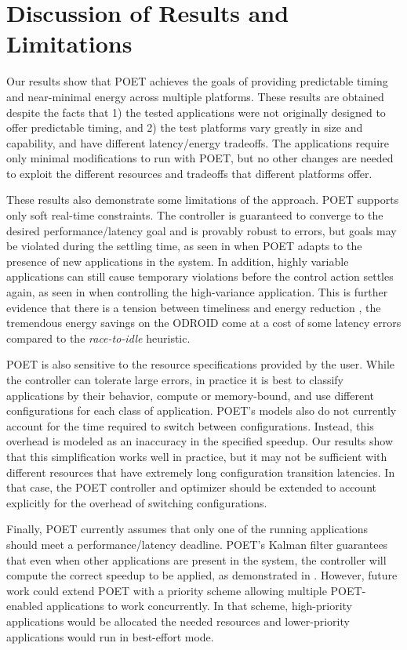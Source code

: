\section{Discussion of Results and Limitations}

Our results show that POET achieves the goals of providing predictable timing and near-minimal energy across multiple platforms.
These results are obtained despite the facts that 1) the tested applications were not originally designed to offer predictable timing, and 2) the test platforms vary greatly in size and capability, and have different latency/energy tradeoffs.
The applications require only minimal modifications to run with POET, but no other changes are needed to exploit the different resources and tradeoffs that different platforms offer.

These results also demonstrate some limitations of the approach.
POET supports only soft real-time constraints.
The controller is guaranteed to converge to the desired performance/latency goal and is provably robust to errors, but goals may be violated during the settling time, as seen in  when POET adapts to the presence of new applications in the system.
In addition, highly variable applications can still cause temporary violations before the control action settles again, as seen in  when controlling the high-variance  application.
This is further evidence that there is a tension between timeliness and energy reduction \cite{Abeni}, \eg the tremendous energy savings on the ODROID come at a cost of some latency errors compared to the \emph{race-to-idle} heuristic.

POET is also sensitive to the resource specifications provided by the user.
While the controller can tolerate large errors, in practice it is best to classify applications by their behavior, \eg compute or memory-bound, and use different configurations for each class of application.
POET's models also do not currently account for the time required to switch between configurations.
Instead, this overhead is modeled as an inaccuracy in the specified speedup.
Our results show that this simplification works well in practice, but it may not be sufficient with different resources that have extremely long configuration transition latencies.
In that case, the POET controller and optimizer should be extended to account explicitly for the overhead of switching configurations.

Finally, POET currently assumes that only one of the running applications should meet a performance/latency deadline.
POET's Kalman filter guarantees that even when other applications are present in the system, the controller will compute the correct speedup to be applied, as demonstrated in .
However, future work could extend POET with a priority scheme allowing multiple POET-enabled applications to work concurrently.
In that scheme, high-priority applications would be allocated the needed resources and lower-priority applications would run in best-effort mode.
